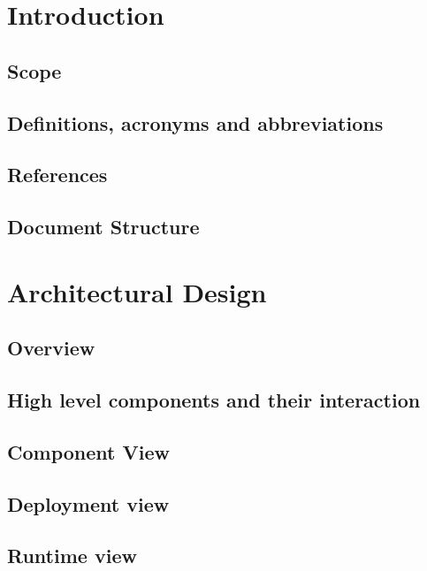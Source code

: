 \documentclass{../Common/Structure/doc_pdf}
\begin{document}
\titleToc

\chapter{Introduction}

\section{Scope}

\section{Definitions, acronyms and abbreviations}

\section{References}

\section{Document Structure}

\newpage

\chapter{Architectural Design}
\section{Overview}

\section{High level components and their interaction}

\section{Component View}
\section{Deployment view}
\section{Runtime view}

\end{document}
